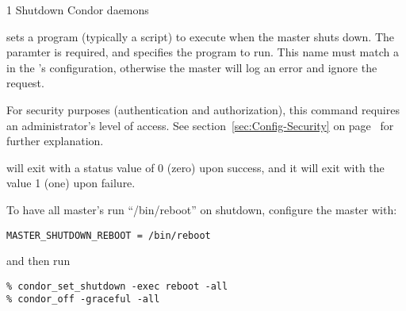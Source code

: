 \begin{ManPage}{\label{man-condor-set-shutdown}}{1}
{Shutdown Condor daemons}
\Synopsis {}
\ToolArgsBase

\ToolDebugOption
\ToolArgsLocate
\ToolArgsAffect

\ToolDebugOption
\ToolWhere
\ToolArgsAffect


\Description 

 sets a program (typically a script) to execute
when the master shuts down.  The  paramter
is required, and specifies the program to run.  This name must match a
 in the 's
configuration, otherwise the master will log an error and ignore the
request.

For security purposes (authentication and authorization),
this command requires an administrator's level of access.
See
section~\ref{sec:Config-Security} on page~\pageref{sec:Config-Security}
for further explanation.

\begin{Options}
	\ToolArgsBaseDesc
	\ToolDebugDesc
	\ToolArgsLocateDesc
	\ToolArgsAffectDesc
\end{Options}

\ExitStatus
{} will exit with a status value of 0 (zero) upon
success, and it will exit with the value 1 (one) upon failure.


\Examples
To have all master's run ``/bin/reboot'' on shutdown, configure the
master with:
\begin{verbatim}
MASTER_SHUTDOWN_REBOOT = /bin/reboot
\end{verbatim}
and then run
\begin{verbatim}
% condor_set_shutdown -exec reboot -all
% condor_off -graceful -all
\end{verbatim}

\end{ManPage}
